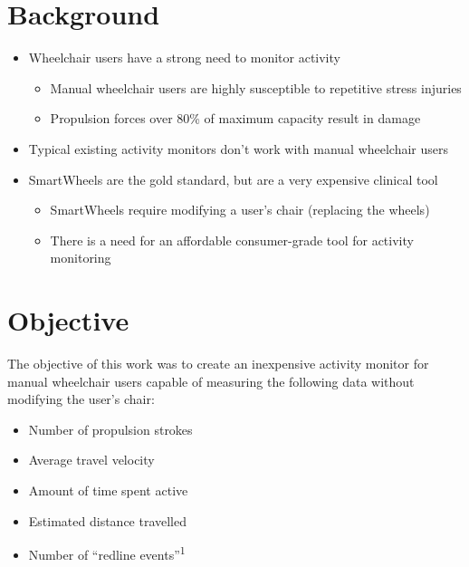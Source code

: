 \documentclass[a0,landscape]{a0poster}
\begin{document}
\vspace{4cm}

\begin{multicols*}{3}
\large

\section*{Background}
\begin{itemize}
    \item Wheelchair users have a strong need to monitor activity
        \begin{itemize}
            \item Manual wheelchair users are highly susceptible to repetitive stress injuries %
            \item Propulsion forces over 80\% of maximum capacity result in damage %
        \end{itemize}
    \item Typical existing activity monitors don't work with manual wheelchair users
    \item SmartWheels are the gold standard, but are a very expensive clinical tool \cite{asato93}
        \begin{itemize}
            \item SmartWheels require modifying a user's chair (replacing the wheels)
            \item There is a need for an affordable consumer-grade tool for activity monitoring
        \end{itemize}
\end{itemize}

\section*{Objective}
The objective of this work was to create an inexpensive activity monitor for manual wheelchair users capable of measuring the following data without modifying the user's chair:

\begin{itemize}
    \item Number of propulsion strokes
    \item Average travel velocity
    \item Amount of time spent active
    \item Estimated distance travelled
    \item Number of ``redline events''\textsuperscript{1}
\end{itemize}


\end{multicols*}
\end{document}
